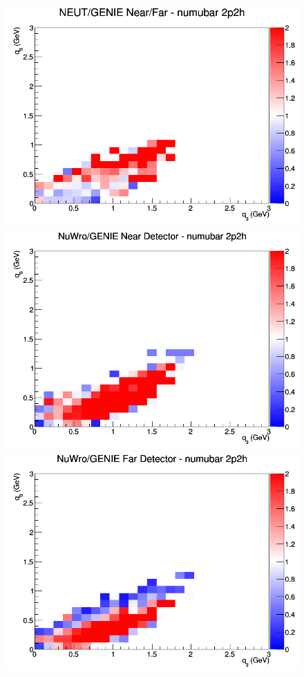 \documentclass[12pt]{article}
\begin{document}
\begin{figure}[h]
\endminipage
{}
\includegraphics[width=\linewidth]{eff_q0_q3/GAr/ratios/2p2h_NEUT_GENIE_numubar_NF_q3_q0.png}
\endminipage
\newline
{}
\includegraphics[width=\linewidth]{eff_q0_q3/GAr/ratios/2p2h_NuWro_GENIE_numubar_near_q3_q0.png}
\endminipage
{}
\includegraphics[width=\linewidth]{eff_q0_q3/GAr/ratios/2p2h_NuWro_GENIE_numubar_far_q3_q0.png}

\end{figure}
\end{document}
